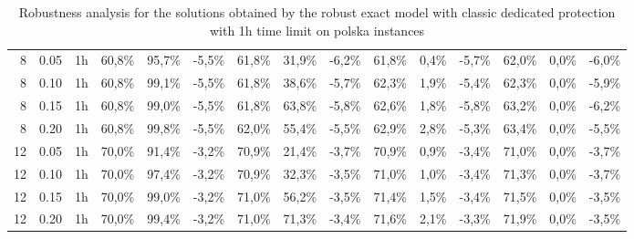 \documentclass[final,5p,times,twocolumn]{elsarticle}
\begin{document}
\begin{table*}[!htb]
\begin{tabular}{rcccccccccccccc}
8 & 0.05 & 1h &  60,8\% & 95,7\% & -5,5\% & 61,8\% & 31,9\% & -6,2\% & 61,8\% & 0,4\% & -5,7\% & 62,0\% & 0,0\% & -6,0\%  \\ 
8 & 0.10 & 1h &  60,8\% & 99,1\% & -5,5\% & 61,8\% & 38,6\% & -5,7\% & 62,3\% & 1,9\% & -5,4\% & 62,3\% & 0,0\% & -5,9\%  \\ 
8 & 0.15 & 1h &  60,8\% & 99,0\% & -5,5\% & 61,8\% & 63,8\% & -5,8\% & 62,6\% & 1,8\% & -5,8\% & 63,2\% & 0,0\% & -6,2\%  \\ 
8 & 0.20 & 1h &  60,8\% & 99,8\% & -5,5\% & 62,0\% & 55,4\% & -5,5\% & 62,9\% & 2,8\% & -5,3\% & 63,4\% & 0,0\% & -5,5\%  \\ 
12 & 0.05 & 1h & 70,0\% & 91,4\% & -3,2\% & 70,9\% & 21,4\% & -3,7\% & 70,9\% & 0,9\% & -3,4\% & 71,0\% & 0,0\% & -3,7\%  \\
12 & 0.10 & 1h & 70,0\% & 97,4\% & -3,2\% & 70,9\% & 32,3\% & -3,5\% & 71,0\% & 1,0\% & -3,4\% & 71,3\% & 0,0\% & -3,7\%  \\
12 & 0.15 & 1h & 70,0\% & 99,0\% & -3,2\% & 71,0\% & 56,2\% & -3,5\% & 71,4\% & 1,5\% & -3,4\% & 71,5\% & 0,0\% & -3,5\%  \\
12 & 0.20 & 1h & 70,0\% & 99,4\% & -3,2\% & 71,0\% & 71,3\% & -3,4\% & 71,6\% & 2,1\% & -3,3\% & 71,9\% & 0,0\% & -3,5\%  \\
\end{tabular}
\caption{Robustness analysis  for the solutions obtained by the robust exact model with classic dedicated protection  with 1h time limit on polska instances}
\label{tab:polska_model_robust-ded}
\end{table*}
\end{document}
